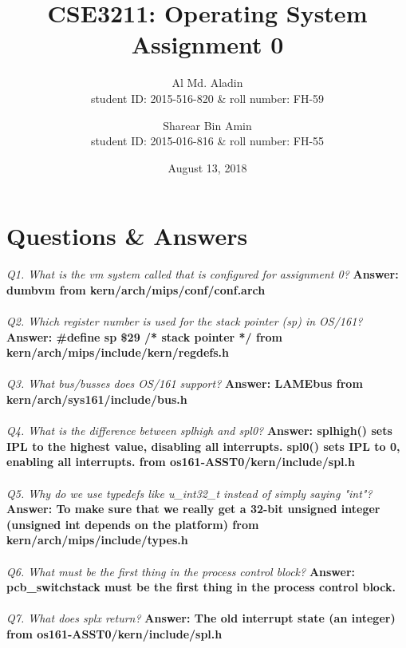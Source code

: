 \documentclass[11pt, english]{article}
\title{CSE3211: Operating System Assignment 0} %
\author{Al Md. Aladin\\
	student ID: 2015-516-820 \& roll number: FH-59
	\and
Sharear Bin Amin\\
student ID: 2015-016-816 \& roll number: FH-55
}
\date{August 13, 2018} %
\begin{document}
\maketitle
\section{Questions \& Answers}
\textit{Q1. What is the vm system called that is configured for assignment 0?}\newline %
\textbf{Answer: dumbvm from kern/arch/mips/conf/conf.arch
	}\\ \\ %
\textit{Q2. Which register number is used for the stack pointer (sp) in OS/161?}\newline
\textbf{Answer: \#define sp \$29 /* stack pointer */  from kern/arch/mips/include/kern/regdefs.h
	}\\ \\
\textit{Q3. What bus/busses does OS/161 support?}\newline
\textbf{Answer: LAMEbus      from kern/arch/sys161/include/bus.h
	}\\ \\
\textit{Q4. What is the difference between splhigh and spl0?}\newline
\textbf{Answer: splhigh()    sets IPL to the highest value, disabling all interrupts.
	spl0()       sets IPL to 0, enabling all interrupts.
	from os161-ASST0/kern/include/spl.h
	}\\ \\
\textit{Q5. Why do we use typedefs like u\_int32\_t instead of simply saying "int"?}\newline
\textbf{Answer: To make sure that we really get a 32-bit unsigned integer
	(unsigned int depends on the platform)
	from kern/arch/mips/include/types.h
	}\\ \\
\textit{Q6. What must be the first thing in the process control block?}\newline
\textbf{Answer: pcb\_switchstack must be the first thing in the process control block.
	}\\ \\
\textit{Q7. What does splx return?}\newline
\textbf{Answer: The old interrupt state (an integer)
	from os161-ASST0/kern/include/spl.h
}\\ \\
\end{document}
